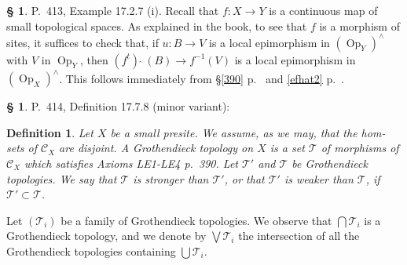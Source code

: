 \documentclass[12pt]{article}%
\newtheorem{df}[thm]{Definition}%
\theoremstyle{remark}
\theoremstyle{definition}
\newtheorem{s}[thm]{\S}%
\newcommand{\cc}{\mathcal}
\newcommand{\oo}{\operatorname}
\newcommand{\C}{\mathcal C}
\newcommand{\fthat}{(f^t)\ \widehat{}\ }
\begin{document}
%

\begin{s}
P.~413, Example 17.2.7 (i). Recall that $f:X\to Y$ is a continuous map of small topological spaces. %
As explained in the book, to see that $f$ is a morphism of sites, it suffices to check that, if $u:B\to V$ is a local epimorphism in $(\oo{Op}_Y)^\wedge$ with $V$ in $\oo{Op}_Y$, then $\fthat(B)\to f^{-1}(V)$ is a local epimorphism in $(\oo{Op}_X)^\wedge$. This follows immediately from \S\ref{390} p.~\pageref{390} and \eqref{efhat2} p.~\pageref{efhat2}. 
\end{s}

%

\begin{s} 
P.~414, Definition 17.7.8 (minor variant):

\begin{df}\label{1778}
Let $X$ be a small presite. We assume, as we may, that the hom-sets of $\C_X$ are disjoint. A {\em Grothendieck topology} on $X$ is a set $\cc T$ of morphisms of $\C_X$ which satisfies Axioms LE1-LE4 p.~390. Let $\cc T'$ and $\cc T$ be Grothendieck topologies. We say that $\cc T$ is {\em stronger than} $\cc T'$, or that $\cc T'$ is {\em weaker than} $\cc T$, if $\cc T'\subset\cc T$. 
\end{df}

Let $(\cc T_i)$ be a family of Grothendieck topologies. We observe that $\bigcap\cc T_i$ is a Grothendieck topology, and we denote by $\bigvee\cc T_i$ the intersection of all the Grothendieck topologies containing $\bigcup\cc T_i$.
\end{s}

%
\end{document}
